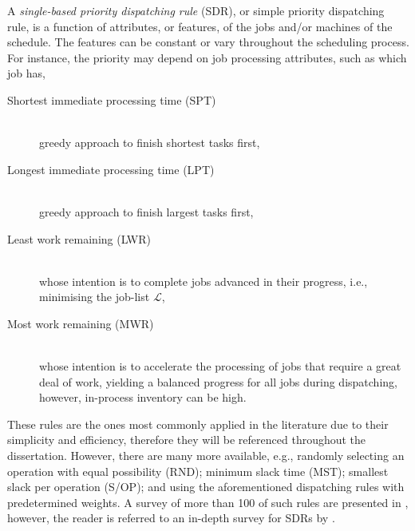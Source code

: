 A \emph{single-based priority dispatching rule} (SDR), or simple priority 
dispatching rule, is a function of attributes, or features, of the jobs and/or 
machines of the schedule. The features can be constant or vary throughout the 
scheduling process. For instance, the priority may depend on job processing 
attributes, such as which job has, 
\begin{description}
	\item[Shortest immediate processing time (SPT)] \hfill \\
	greedy approach to finish shortest tasks first,  
	\item[Longest immediate processing time (LPT)] \hfill \\
	greedy approach to finish largest tasks first, 
	\item[Least work remaining (LWR)] \hfill \\
	whose intention is to complete jobs advanced in their pro\-gress, i.e., 
	minimising the job-list $\mathcal{L}$,
	\item[Most work remaining (MWR)] \hfill \\
	whose intention is to accelerate the processing of jobs that require a 
	great deal of work, yielding a balanced progress for all jobs during 
	dispatching, however, in-process inventory can be high.
\end{description}
These rules are the ones most commonly applied in the literature due to their simplicity and efficiency, %
therefore they will be referenced throughout the dissertation. 
However, there are many more available, e.g., randomly selecting an operation 
with equal possibility (RND); minimum slack time (MST); smallest slack per 
operation (S/OP); and using the aforementioned dispatching rules with 
predetermined weights. A survey of more than 100 of such rules are presented in 
\citet{Panwalkar77}, however, the reader is referred to an in-depth survey for 
SDRs by \citet{Haupt89}. 


